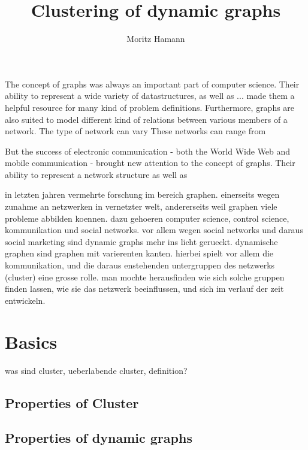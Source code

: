 \documentclass[journal]{vgtc}
\author{Moritz Hamann}
\title{Clustering of dynamic graphs}
\begin{document}

\maketitle
  
  The concept of graphs was always an important part of computer 
  science. Their ability to represent a wide variety of datastructures, 
  as well as ...
  made them a helpful
  resource for many kind of problem definitions.  
  Furthermore, graphs are also suited
  to model different kind of relations between various members of a network.
  The type of network can vary These networks can range from 
  
  But the success of electronic communication
  - both the World Wide Web and mobile communication - brought new attention to the concept
  of graphs. Their ability to represent a network structure as well as 
  
  in letzten jahren vermehrte forschung im bereich graphen. einerseits wegen
  zunahme an netzwerken in vernetzter welt, andererseits weil graphen viele
  probleme abbilden koennen. dazu gehoeren computer science, control science,
  kommunikation und social networks.
  vor allem wegen social networks und daraus social marketing sind dynamic
  graphs mehr ins licht gerueckt. dynamische graphen sind graphen mit varierenten
  kanten. hierbei spielt vor allem die kommunikation, und die daraus enstehenden
  untergruppen des netzwerks (cluster) eine grosse rolle. man mochte herausfinden
  wie sich solche gruppen finden lassen, wie sie das netzwerk beeinflussen,
  und sich im verlauf der zeit entwickeln.


\section{Basics}
  was sind cluster, ueberlabende cluster, definition?
  \subsection{Properties of Cluster}
  \subsection{Properties of dynamic graphs}
  
\end{document}
